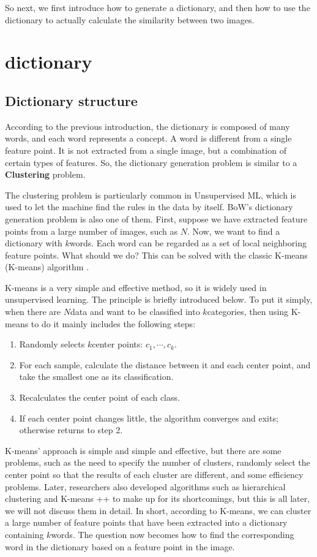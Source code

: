 So next, we first introduce how to generate a dictionary, and then how to use the dictionary to actually calculate the similarity between two images.

\section{dictionary}
\subsection{Dictionary structure}
According to the previous introduction, the dictionary is composed of many words, and each word represents a concept. A word is different from a single feature point. It is not extracted from a single image, but a combination of certain types of features. So, the dictionary generation problem is similar to a \textbf{Clustering} problem.

The clustering problem is particularly common in Unsupervised ML, which is used to let the machine find the rules in the data by itself. BoW's dictionary generation problem is also one of them. First, suppose we have extracted feature points from a large number of images, such as $N $. Now, we want to find a dictionary with $k $words. Each word can be regarded as a set of local neighboring feature points. What should we do? This can be solved with the classic K-means (K-means) algorithm \textsuperscript{\cite{Lloyd1982}}.

K-means is a very simple and effective method, so it is widely used in unsupervised learning. The principle is briefly introduced below. To put it simply, when there are $N $data and want to be classified into $k $categories, then using K-means to do it mainly includes the following steps:
\begin{mdframed}
\begin{enumerate}
\item Randomly selects $k $center points: $c_1, \cdots, c_k $.
\item For each sample, calculate the distance between it and each center point, and take the smallest one as its classification.
\item Recalculates the center point of each class.
\item If each center point changes little, the algorithm converges and exits; otherwise returns to step 2.
\end{enumerate}
\end{mdframed}

K-means' approach is simple and simple and effective, but there are some problems, such as the need to specify the number of clusters, randomly select the center point so that the results of each cluster are different, and some efficiency problems. Later, researchers also developed algorithms such as hierarchical clustering and K-means ++ \textsuperscript{\cite{Arthur2007}} to make up for its shortcomings, but this is all later, we will not discuss them in detail. In short, according to K-means, we can cluster a large number of feature points that have been extracted into a dictionary containing $k $words. The question now becomes how to find the corresponding word in the dictionary based on a feature point in the image.

